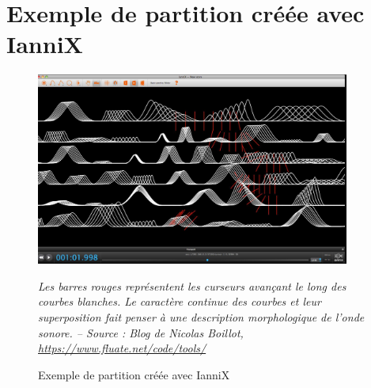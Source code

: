 \section{Exemple de partition créée avec IanniX}
\label{sec:exemplePartitionIannix}
\begin{figure}[H]
	\centering
	\includegraphics[keepaspectratio=true, width=0.92\textwidth]{Annexes/i/exemplePartitionIannix.jpg}
	\caption{Exemple de partition créée avec IanniX}
	\medskip
	\small
	\it
	Les barres rouges représentent les curseurs avançant le long des courbes blanches.
	Le caractère continue des courbes et leur superposition fait penser à une description morphologique de l'onde sonore. -- Source : Blog de Nicolas Boillot, \url{https://www.fluate.net/code/tools/} 	
	\label{fig:exemplePartitionIannix}
\end{figure}

